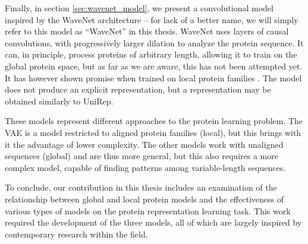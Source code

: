 Finally, in section \ref{sec:wavenet_model}, we present a convolutional model inspired by the WaveNet \cite{oord2016wavenet} architecture -- for lack of a better name, we will simply refer to this model as ``WaveNet'' in this thesis. WaveNet uses layers of causal convolutions, with progressively larger dilation to analyze the protein sequence. It can, in principle, process proteins of arbitrary length, allowing it to train on the global protein space, but as far as we are aware, this has not been attempted yet. It has however shown promise when trained on local protein families \cite{riesselman2019accelerating}. The model does not produce an explicit representation, but a representation may be obtained similarly to UniRep.


These models represent different approaches to the protein learning problem. The VAE is a model restricted to aligned protein families (local), but this brings with it the advantage of lower complexity. The other models work with unaligned sequences (global) and are thus more general, but this also requires a more complex model, capable of finding patterns among variable-length sequences.

 To conclude, our contribution in this thesis includes an examination of the relationship between global and local protein models and the effectiveness of various types of models on the protein representation learning task. This work required the development of the three models, all of which are largely inspired by contemporary research within the field.

